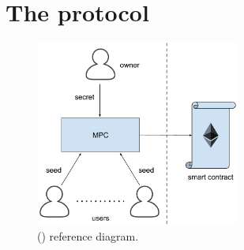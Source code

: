 \section{The \shortname protocol}\label{sect:model}


\begin{figure}[tp]
	\centering
	\includegraphics[width=0.6\textwidth]{fig/proposal}
	\caption{\name (\shortname) reference diagram.}
	\label{fig:model}
\end{figure}




%
%

%



